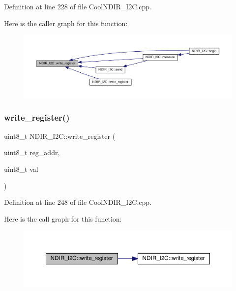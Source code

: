 Definition at line 228 of file Cool\+N\+D\+I\+R\+\_\+\+I2\+C.\+cpp.

Here is the caller graph for this function\+:
\nopagebreak
\begin{figure}[H]
\begin{center}
\leavevmode
\includegraphics[width=350pt]{class_n_d_i_r___i2_c_a5de6a044b00e985f035edca07521e319_icgraph}
\end{center}
\end{figure}
\mbox{\label{class_n_d_i_r___i2_c_a8ad2a76f9866b0a1f34810a147b4b20d}} 
\subsubsection{\texorpdfstring{write\+\_\+register()}{write\_register()}\hspace{0.1cm}{\footnotesize\ttfamily [2/2]}}
{\footnotesize\ttfamily uint8\+\_\+t N\+D\+I\+R\+\_\+\+I2\+C\+::write\+\_\+register (\begin{DoxyParamCaption}\item[{uint8\+\_\+t}]{reg\+\_\+addr,  }\item[{uint8\+\_\+t}]{val }\end{DoxyParamCaption})\hspace{0.3cm}{\ttfamily [private]}}



Definition at line 248 of file Cool\+N\+D\+I\+R\+\_\+\+I2\+C.\+cpp.

Here is the call graph for this function\+:
\nopagebreak
\begin{figure}[H]
\begin{center}
\leavevmode
\includegraphics[width=350pt]{class_n_d_i_r___i2_c_a8ad2a76f9866b0a1f34810a147b4b20d_cgraph}
\end{center}
\end{figure}


